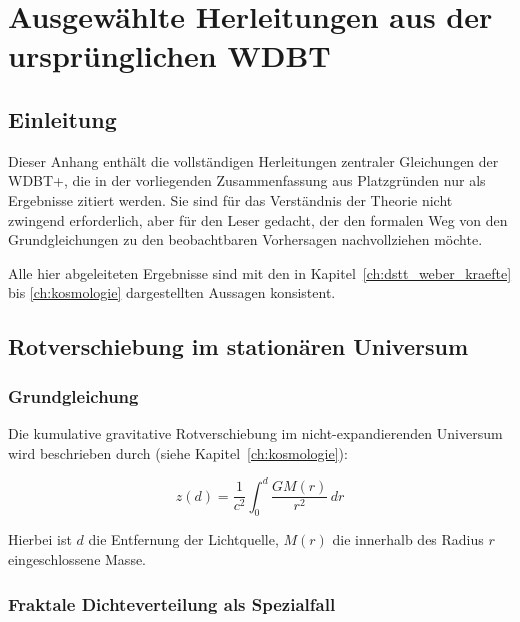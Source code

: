 
\chapter{Ausgewählte Herleitungen aus der ursprünglichen WDBT}
\label{app:herleitungen}

\section{Einleitung}
\label{app:herleitungen_einleitung}

Dieser Anhang enthält die vollständigen Herleitungen zentraler Gleichungen der WDBT+, die in der vorliegenden Zusammenfassung aus Platzgründen nur als Ergebnisse zitiert werden. Sie sind für das Verständnis der Theorie nicht zwingend erforderlich, aber für den Leser gedacht, der den formalen Weg von den Grundgleichungen zu den beobachtbaren Vorhersagen nachvollziehen möchte.

Alle hier abgeleiteten Ergebnisse sind mit den in Kapitel~\ref{ch:dstt_weber_kraefte} bis \ref{ch:kosmologie} dargestellten Aussagen konsistent.

\section{Rotverschiebung im stationären Universum}
\label{app:herleitungen_rotverschiebung}

\subsection{Grundgleichung}
\label{sub:herleitungen_rot_grund}

Die kumulative gravitative Rotverschiebung im nicht-expandierenden Universum wird beschrieben durch (siehe Kapitel~\ref{ch:kosmologie}):

\[
z(d) = \frac{1}{c^2} \int_0^d \frac{GM(r)}{r^2} \, dr \tag{D.1}
\]

Hierbei ist \( d \) die Entfernung der Lichtquelle, \( M(r) \) die innerhalb des Radius \( r \) eingeschlossene Masse.

\subsection{Fraktale Dichteverteilung als Spezialfall}
\label{sub:herleitungen_rot_dichte}


